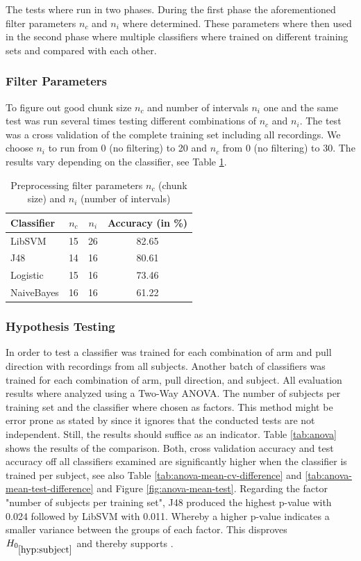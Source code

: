 \documentclass[journal]{IEEEtran}
\begin{document}
The tests where run in two phases. During the first phase the aforementioned filter parameters $n_c$ and $n_i$ where determined. These parameters where then used in the second phase where multiple classifiers where trained on different training sets and compared with each other.

\subsubsection{Filter Parameters}

To figure out good chunk size $n_c$ and number of intervals $n_i$ one and the same test was run several times testing different combinations of $n_c$ and $n_i$. The test was a cross validation of the complete training set including all recordings. We choose $n_i$ to run from 0 (no filtering) to 20 and $n_c$ from 0 (no filtering) to 30. The results vary depending on the classifier, see Table \ref{tab:filterparameters}. 

\begin{table}
\centering
\begin{tabular}{lccc}
\textbf{Classifier} & \textbf{$n_c$} & \textbf{$n_i$} & \textbf{Accuracy (in \%)} \\
\hline
LibSVM & 15 & 26 & 82.65\\
J48 & 14 & 16 & 80.61\\
Logistic & 15 & 16 & 73.46\\
NaiveBayes & 16 & 16 &  61.22\\
\end{tabular}
\caption{Preprocessing filter parameters $n_c$ (chunk size) and $n_i$ (number of intervals)}
\label{tab:filterparameters}
\end{table}

\subsubsection{Hypothesis Testing}

In order to test  a classifier was trained for each combination of arm and pull direction with recordings from all subjects. Another batch of classifiers was trained for each combination of arm, pull direction, and subject. All evaluation results where analyzed using a Two-Way ANOVA. The number of subjects per training set and the classifier where chosen as factors. This method might be error prone as stated by \citeauthor{ref1} since it ignores that the conducted tests are not independent. Still, the results should suffice as an indicator. Table \ref{tab:anova} shows the results of the comparison. Both, cross validation accuracy and test accuracy off all classifiers examined are significantly higher when the classifier is trained per subject, see also Table \ref{tab:anova-mean-cv-difference} and \ref{tab:anova-mean-test-difference} and Figure \ref{fig:anova-mean-test}. Regarding the factor "number of subjects per training set", J48 produced the highest p-value with 0.024 followed by LibSVM with 0.011. Whereby a higher p-value indicates a smaller variance between the groups of each factor. This disproves $H_{0_{\ref{hyp:subject}}}$ and thereby supports .
\end{document}
